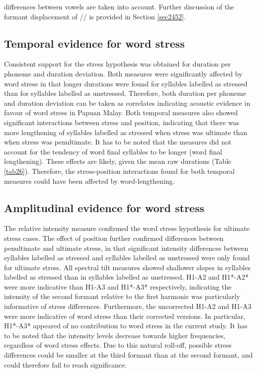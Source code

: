 differences between vowels are taken into account. Further discussion of the formant displacement of // is provided in Section \ref{sec2452}.

\subsection{Temporal evidence for word stress} \label{sec242}
Consistent support for the stress hypothesis was obtained for duration per phoneme and duration deviation. Both measures were significantly affected by word stress in that longer durations were found for syllables labelled as stressed than for syllables labelled as unstressed. Therefore, both duration per phoneme and duration deviation can be taken as correlates indicating acoustic evidence in favour of word stress in Papuan Malay. Both temporal measures also showed significant interactions between stress and position, indicating that there was more lengthening of syllables labelled as stressed when stress was ultimate than when stress was penultimate. It has to be noted that the measures did not account for the tendency of word final syllables to be longer (word final lengthening). These effects are likely, given the mean raw durations (Table \ref{tab26}). Therefore, the stress-position interactions found for both temporal measures could have been affected by word-lengthening.

\subsection{Amplitudinal evidence for word stress}
The relative intensity measure confirmed the word stress hypothesis for ultimate stress cases. The effect of position further confirmed differences between penultimate and ultimate stress, in that significant intensity differences between syllables labelled as stressed and syllables labelled as unstressed were only found for ultimate stress. All spectral tilt measures showed shallower slopes in syllables labelled as stressed than in syllables labelled as unstressed. H1-A2 and H1*-A2* were more indicative than H1-A3 and H1*-A3* respectively, indicating the intensity of the second formant relative to the first harmonic was particularly informative of stress differences. Furthermore, the uncorrected H1-A2 and H1-A3 were more indicative of word stress than their corrected versions. In particular, H1*-A3* appeared of no contribution to word stress in the current study. It has to be noted that the intensity levels decrease towards higher frequencies, regardless of word stress effects. Due to this natural roll-off, possible stress differences could be smaller at the third formant than at the second formant, and could therefore fail to reach significance.

